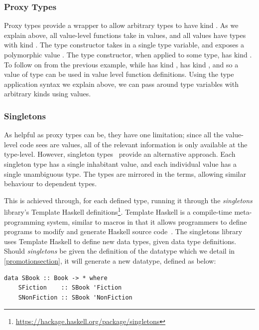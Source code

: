\subsubsection{Proxy Types}

Proxy types provide a wrapper to allow arbitrary types to have kind \inline{*}. As we explain above, all value-level functions take in values, and all values have types with kind \inline{*}. The  type constructor takes in a single type variable, and exposes a polymorphic value . The  type constructor, when applied to some type, has kind \inline{*}. To follow on from the previous  example, while  has kind ,  has kind \inline{*}, and so a  value of type  can be used in value level function definitions. Using the type application syntax we explain above, we can pass around type variables with arbitrary kinds using  values.

\subsubsection{Singletons}

As helpful as proxy types can be, they have one limitation; since all the value-level code sees are  values, all of the relevant information is only available at the type-level. However, singleton types~\cite{singletons} provide an alternative approach. Each singleton type has a single inhabitant value, and each individual value has a single unambiguous type. The types are mirrored in the terms, allowing similar behaviour to dependent types.

This is achieved through, for each defined type, running it through the \textit{singletons} library's Template Haskell definitions\footnote{\url{https://hackage.haskell.org/package/singletons}}. Template Haskell is a compile-time meta-programming system, similar to macros in that it allows programmers to define programs to modify and generate Haskell source code~\cite{templatehaskell}. The singletons library uses Template Haskell to define new data types, given data type definitions. Should \textit{singletons} be given the definition of the  datatype which we detail in \cref{promotionsection}, it will generate a new  datatype, defined as below:

\begin{lstlisting}
data SBook :: Book -> * where
    SFiction    :: SBook 'Fiction
    SNonFiction :: SBook 'NonFiction
\end{lstlisting}

